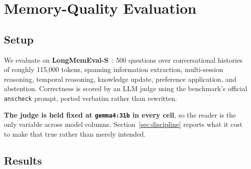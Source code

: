 \section{Memory-Quality Evaluation}
\label{sec:memquality}

\subsection{Setup}

We evaluate on \textbf{LongMemEval-S}~\cite{wu2024longmemeval}: 500 questions over conversational histories of roughly 115{,}000 tokens, spanning information extraction, multi-session reasoning, temporal reasoning, knowledge update, preference application, and abstention. Correctness is scored by an LLM judge using the benchmark's official \texttt{anscheck} prompt, ported verbatim rather than rewritten.

\textbf{The judge is held fixed at \texttt{gemma4:31b} in every cell}, so the reader is the only variable across model columns. Section~\ref{sec:discipline} reports what it cost to make that true rather than merely intended.

\subsection{Results}

\begin{table}[!htbp]
\centering
\caption{LongMemEval-S, $n=500$. The oracle is handed the gold answer-bearing turns; the composite uses no gold annotations, only inputs available in production.}
\label{tab:lme_arms}
\end{table}


